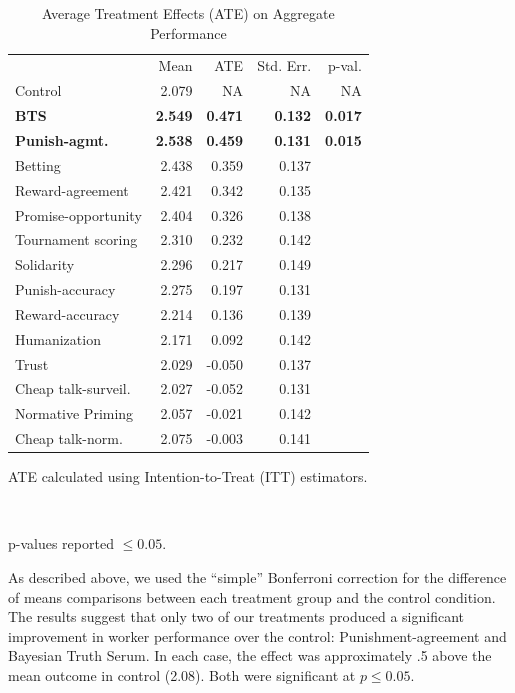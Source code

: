 \documentclass{cscw2010}
\begin{document}
\begin{table}[ht]					%
\begin{center}						%
\caption{Average Treatment Effects (ATE) on Aggregate Performance} %
\vspace{8pt}
\begin{threeparttable}
\begin{tabular}{@{}l r r r r@{}}
\toprule
& Mean & ATE\tnote{\dag} & Std. Err. & p-val.\tnote{\ddag}\\
\cmidrule(l){2-5}
Control & 2.079 & NA & NA & NA\\
\textbf{BTS} & \textbf{2.549} & \textbf{0.471} & \textbf{0.132} & \textbf{0.017}\\
\textbf{Punish-agmt.} & \textbf{2.538} & \textbf{0.459} & \textbf{0.131} & \textbf{0.015}\\
Betting& 2.438 & 0.359 & 0.137 &\\ 
Reward-agreement& 2.421 & 0.342 & 0.135 &\\
Promise-opportunity& 2.404 & 0.326 & 0.138 &\\
Tournament scoring & 2.310 & 0.232 & 0.142 &\\
Solidarity& 2.296 & 0.217 & 0.149 &\\
Punish-accuracy& 2.275 & 0.197 & 0.131 & \\
Reward-accuracy& 2.214 & 0.136 & 0.139 &\\
Humanization& 2.171 & 0.092 & 0.142 &\\
Trust& 2.029 & -0.050 & 0.137 &\\
Cheap talk-surveil.& 2.027 & -0.052 & 0.131 &\\
Normative Priming& 2.057 & -0.021 & 0.142 &\\
Cheap talk-norm.& 2.075 & -0.003 & 0.141 &\\
  \bottomrule
\end{tabular}
  \begin{tablenotes}[para]
     \small{\item[\dag]ATE calculated using Intention-to-Treat (ITT) estimators.}\\
     \item[\ddag]p-values reported $\leq 0.05$.
  \end{tablenotes}
\end{threeparttable}
\label{table:agg_results_ITT}
\end{center}
\end{table}

As described above, we used the ``simple'' Bonferroni correction for
the difference of means comparisons between each treatment group and
the control condition. The results suggest that only two of our
treatments produced a significant improvement in worker performance
over the control: Punishment-agreement and Bayesian Truth Serum. In
each case, the effect was approximately .5 above the mean outcome in
control (2.08). Both were significant at $p \leq0.05$.
\end{document}
